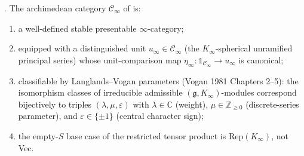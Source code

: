 \begin{theorem}
\label{v4-arith:lacd:thm:L0-closed}
\ClaimStatusProvedHere. The archimedean category \(\mathcal{C}_{\infty}\)
of  is:
\begin{enumerate}
\item a well-defined stable presentable \(\infty\)-category;
\item equipped with a distinguished unit
\(u_{\infty} \in \mathcal{C}_{\infty}\) (the \(K_{\infty}\)-spherical
unramified principal series) whose unit-comparison map
\(\eta_{\infty}: \mathbb{1}_{\mathcal{C}_{\infty}} \to u_{\infty}\)
is canonical;
\item classifiable by Langlands--Vogan parameters (Vogan 1981
Chapters 2--5): the isomorphism classes of irreducible admissible
\((\mathfrak{g}, K_{\infty})\)-modules correspond bijectively to
triples \((\lambda, \mu, \varepsilon)\) with \(\lambda \in \mathbb{C}\)
(weight), \(\mu \in \mathbb{Z}_{\geq 0}\) (discrete-series parameter),
and \(\varepsilon \in \{\pm 1\}\) (central character sign);
\item the empty-\(S\) base case of the restricted tensor product is
\(\mathrm{Rep}(K_{\infty})\), not Vec.
\end{enumerate}
\end{theorem}

